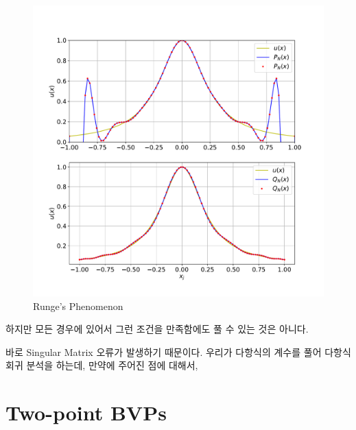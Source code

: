 \documentclass[11pt]{article}
\begin{document}
\begin{figure}[!ht]
  \centering
  \includegraphics[width=1\textwidth]{Runge_Phenomenon.pdf}
  \caption{Runge's Phenomenon}
\end{figure}
\pagebreak

하지만 모든 경우에 있어서 그런 조건을 만족함에도 풀 수 있는 것은 아니다. 

바로 Singular Matrix 오류가 발생하기 때문이다. 우리가 다항식의 계수를 풀어 다항식 회귀 분석을 하는데, 만약에 주어진 점에 대해서, 









\section{Two-point BVPs}
\end{document}

